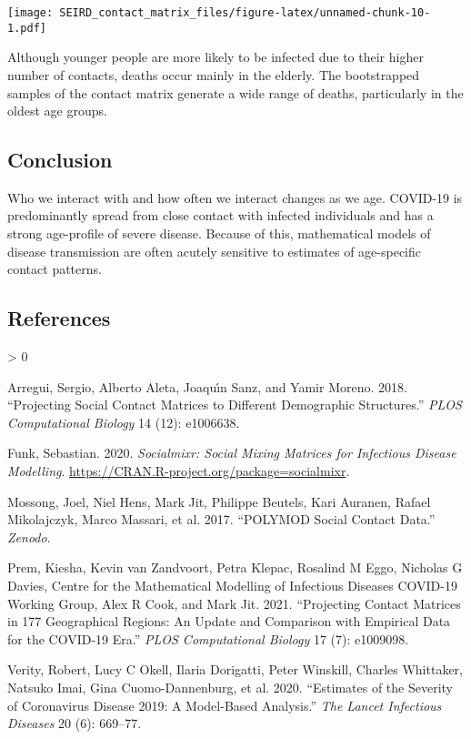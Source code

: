 \documentclass[
]{article}
\newlength{\cslhangindent}
\newenvironment{CSLReferences}[2] %
 {%
  \setlength{\parindent}{0pt}
  \ifodd #1 \everypar{\setlength{\hangindent}{\cslhangindent}}\ignorespaces\fi
  \ifnum #2 > 0
  \setlength{\parskip}{#2\baselineskip}
  \fi
 }%
 {}
\begin{document}
\texttt{[image: SEIRD\_contact\_matrix\_files/figure-latex/unnamed-chunk-10-1.pdf]}

Although younger people are more likely to be infected due to their
higher number of contacts, deaths occur mainly in the elderly. The
bootstrapped samples of the contact matrix generate a wide range of
deaths, particularly in the oldest age groups.

\hypertarget{conclusion}{%
\subsection{Conclusion}\label{conclusion}}

Who we interact with and how often we interact changes as we age.
COVID-19 is predominantly spread from close contact with infected
individuals and has a strong age-profile of severe disease. Because of
this, mathematical models of disease transmission are often acutely
sensitive to estimates of age-specific contact patterns.

\hypertarget{references}{%
\subsection*{References}\label{references}}

\hypertarget{refs}{}
\begin{CSLReferences}{1}{0}
\leavevmode\hypertarget{ref-arregui2018projecting}{}%
Arregui, Sergio, Alberto Aleta, Joaquı́n Sanz, and Yamir Moreno. 2018.
{``Projecting Social Contact Matrices to Different Demographic
Structures.''} \emph{PLOS Computational Biology} 14 (12): e1006638.

\leavevmode\hypertarget{ref-funk2020mixr}{}%
Funk, Sebastian. 2020. \emph{Socialmixr: Social Mixing Matrices for
Infectious Disease Modelling}.
\url{https://CRAN.R-project.org/package=socialmixr}.

\leavevmode\hypertarget{ref-polymod2017}{}%
Mossong, Joel, Niel Hens, Mark Jit, Philippe Beutels, Kari Auranen,
Rafael Mikolajczyk, Marco Massari, et al. 2017. {``POLYMOD Social
Contact Data.''} \emph{Zenodo}.

\leavevmode\hypertarget{ref-prem2021projecting}{}%
Prem, Kiesha, Kevin van Zandvoort, Petra Klepac, Rosalind M Eggo,
Nicholas G Davies, Centre for the Mathematical Modelling of Infectious
Diseases COVID-19 Working Group, Alex R Cook, and Mark Jit. 2021.
{``Projecting Contact Matrices in 177 Geographical Regions: An Update
and Comparison with Empirical Data for the COVID-19 Era.''} \emph{PLOS
Computational Biology} 17 (7): e1009098.

\leavevmode\hypertarget{ref-verity2020estimates}{}%
Verity, Robert, Lucy C Okell, Ilaria Dorigatti, Peter Winskill, Charles
Whittaker, Natsuko Imai, Gina Cuomo-Dannenburg, et al. 2020.
{``Estimates of the Severity of Coronavirus Disease 2019: A Model-Based
Analysis.''} \emph{The Lancet Infectious Diseases} 20 (6): 669--77.

\end{CSLReferences}
\end{document}
